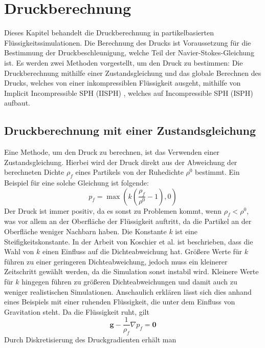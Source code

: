 \documentclass[11pt,
a4paper,
parskip=half, %
BCOR=10mm, %
english,
ngerman]{scrreprt}
\begin{document}
\chapter{Druckberechnung}
Dieses Kapitel behandelt die Druckberechnung in partikelbasierten Flüssigkeitssimulationen.
Die Berechnung des Drucks ist Voraussetzung für die Bestimmung der Druckbeschleunigung, welche Teil der Navier-Stokes-Gleichung ist.
Es werden zwei Methoden vorgestellt, um den Druck zu bestimmen:
Die Druckberechnung mithilfe einer Zustandsgleichung und das globale Berechnen des Drucks, welches von einer inkompressiblen Flüssigkeit ausgeht,
mithilfe von Implicit Incompressible SPH (IISPH) \cite{ihmsen_implicit_2014}, 
welches auf Incompressible SPH (ISPH) \cite{shao_incompressible_2003} aufbaut.


\section{Druckberechnung mit einer Zustandsgleichung}
\label{sec:pressure_computation_state_equation}
Eine Methode, um den Druck zu berechnen, ist das Verwenden einer Zustandsgleichung.
Hierbei wird der Druck direkt aus der Abweichung der berechneten Dichte $\rho_f$ eines Partikels von der Ruhedichte $\rho^0$ bestimmt.
Ein Beispiel für eine solche Gleichung ist folgende:
\begin{equation}
    p_f = \max \left(k \left( \frac{\rho_f}{\rho^0} - 1 \right), 0\right)
\end{equation}
Der Druck ist immer positiv, da es sonst zu Problemen kommt, wenn $\rho_f < \rho^0$, was vor allem an der Oberfläche der Flüssigkeit auftritt,
da die Partikel an der Oberfläche weniger Nachbarn haben.
Die Konstante $k$ ist eine Steifigkeitskonstante.
In der Arbeit von Koschier et al. \cite{koschier_smoothed_2020} ist beschrieben, dass die Wahl von $k$ einen Einfluss auf die Dichteabweichung hat.
Größere Werte für $k$ führen zu einer geringeren Dichteabweichung, jedoch muss ein kleinerer Zeitschritt gewählt werden, da die Simulation sonst instabil wird.
Kleinere Werte für $k$ hingegen führen zu größeren Dichteabweichungen und damit auch zu weniger realistischen Simulationen.
Anschaulich erklären lässt sich dies anhand eines Beispiels mit einer ruhenden Flüssigkeit, die unter dem Einfluss von Gravitation steht.
Da die Flüssigkeit ruht, gilt
\begin{equation}
    \textbf{g} - \frac{1}{\rho_f}\nabla p_f = \textbf{0}
\end{equation}
Durch Diskretisierung des Druckgradienten erhält man
\end{document}
